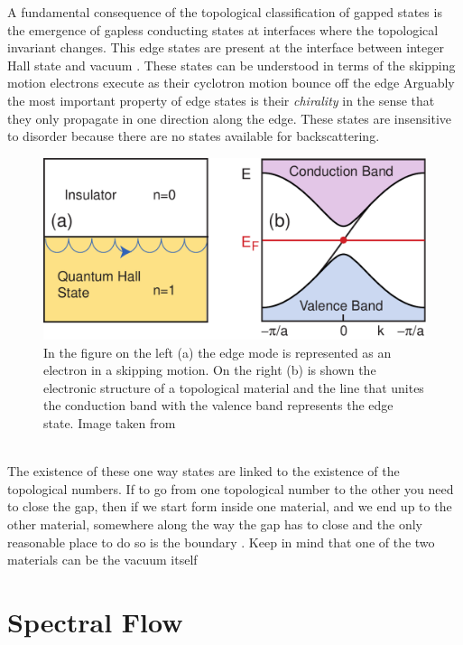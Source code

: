     A fundamental consequence of the topological classification of gapped states is the emergence of gapless conducting states at interfaces where the topological invariant changes. This edge states are present at the interface between integer Hall state and vacuum  \cite{halperin1982quantized}. These states can be understood in terms of the skipping motion electrons execute as their cyclotron motion bounce off the edge Arguably the most important property of edge states is their \textit{chirality} in the sense that they only propagate in one direction along the edge. These states are insensitive to disorder because there are no states available for backscattering.
    \begin{figure}[h]
        \centering
        \includegraphics[width=\textwidth]{Immagini/topo/edge_sates.pdf}
        \caption{
        In the figure on the left (a) the edge mode is represented as an electron in a skipping motion. On the right (b) is shown the electronic structure of a topological material and the line that unites the conduction band with the valence band represents the edge state. Image taken from \cite{hasan2010colloquium}}
        \label{fig:edge}
    \end{figure}\\
    The existence of these one way states are linked to the existence of the topological numbers. If to go from one topological number to the other you need to close the gap, then if we start form inside one material, and we end up to the other material, somewhere along the way the gap has to close and the only reasonable place to do so is the boundary \cite{jackiw1976vacuum}. Keep in mind that one of the two materials can be the vacuum itself 
    

        
\section{Spectral Flow}
    
